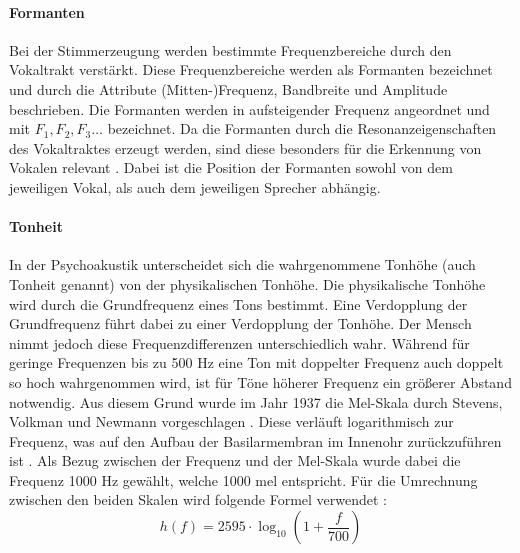 \paragraph{Formanten}
Bei der Stimmerzeugung werden bestimmte Frequenzbereiche durch den Vokaltrakt verstärkt.
Diese Frequenzbereiche werden als Formanten bezeichnet und durch die Attribute (Mitten-)Frequenz, Bandbreite und Amplitude beschrieben.
Die Formanten werden in aufsteigender Frequenz angeordnet und mit $F_1, F_2, F_3 \dots$ bezeichnet.
Da die Formanten durch die Resonanzeigenschaften des Vokaltraktes erzeugt werden, sind diese besonders für die Erkennung von Vokalen relevant \autocite[vgl.][S. 19-20]{pfister_sprachverarbeitung_2017}.
Dabei ist die Position der Formanten sowohl von dem jeweiligen Vokal, als auch dem jeweiligen Sprecher abhängig.
% 

\paragraph{Tonheit}
In der Psychoakustik unterscheidet sich die wahrgenommene Tonhöhe (auch Tonheit genannt) von der physikalischen Tonhöhe.
Die physikalische Tonhöhe wird durch die Grundfrequenz eines Tons bestimmt.
Eine Verdopplung der Grundfrequenz führt dabei zu einer Verdopplung der Tonhöhe.
Der Mensch nimmt jedoch diese Frequenzdifferenzen unterschiedlich wahr.
Während für geringe Frequenzen bis zu 500 Hz eine Ton mit doppelter Frequenz auch doppelt so hoch wahrgenommen wird, ist für Töne höherer Frequenz ein größerer Abstand notwendig.
Aus diesem Grund wurde im Jahr 1937 die Mel-Skala durch Stevens, Volkman und Newmann vorgeschlagen \autocite[vgl.][S. 11]{moser_psychoakustische_2018}.
Diese verläuft logarithmisch zur Frequenz, was auf den Aufbau der Basilarmembran im Innenohr zurückzuführen ist \autocite[vgl.][S. 54]{kroger_neuronale_2018}.
Als Bezug zwischen der Frequenz und der Mel-Skala wurde dabei die Frequenz 1000 Hz gewählt, welche 1000 mel entspricht.
Für die Umrechnung zwischen den beiden Skalen wird folgende Formel verwendet \autocite[vgl.][S. 94-95]{pfister_sprachverarbeitung_2017}:
\begin{equation}
    \label{eq:mel}
    h(f) = 2595 \cdot \log_{10}\left(1 + \frac{f}{700}\right)
\end{equation}

